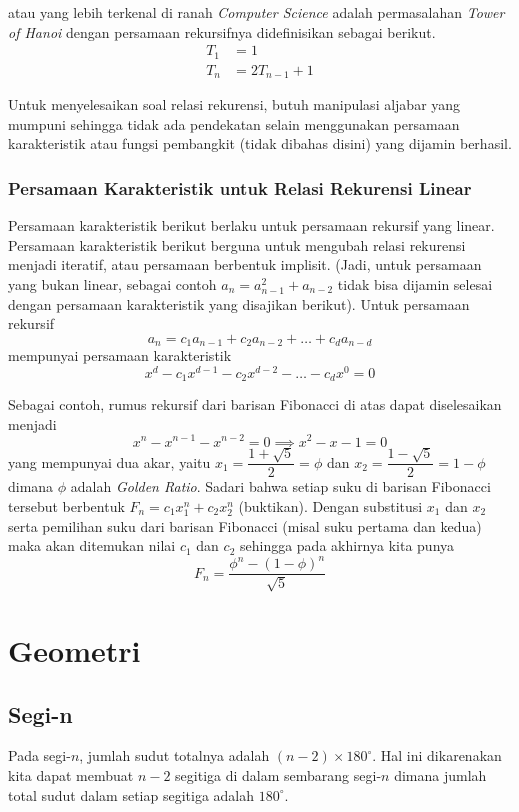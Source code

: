     atau yang lebih terkenal di ranah \textit{Computer Science} adalah permasalahan \textit{Tower of Hanoi} dengan persamaan rekursifnya didefinisikan sebagai berikut.
    \begin{align*}
        T_1 &= 1 \\
        T_n &= 2T_{n-1}+1
    \end{align*}
    
    Untuk menyelesaikan soal relasi rekurensi, butuh manipulasi aljabar yang mumpuni sehingga tidak ada pendekatan selain menggunakan persamaan karakteristik atau fungsi pembangkit (tidak dibahas disini) yang dijamin berhasil.
    
    \subsubsection{Persamaan Karakteristik untuk Relasi Rekurensi Linear}
    Persamaan karakteristik berikut berlaku untuk persamaan rekursif yang linear. Persamaan karakteristik berikut berguna untuk mengubah relasi rekurensi menjadi iteratif, atau persamaan berbentuk implisit. (Jadi, untuk persamaan yang bukan linear, sebagai contoh $a_n = a_{n-1}^2 + a_{n-2}$ tidak bisa dijamin selesai dengan persamaan karakteristik yang disajikan berikut).
    Untuk persamaan rekursif
    $$a_n = c_1a_{n-1}+c_2a_{n-2}+\dots+c_da_{n-d}$$
    mempunyai persamaan karakteristik
    $$x^d-c_1x^{d-1}-c_2x^{d-2}-\dots-c_dx^0=0$$
    
    Sebagai contoh, rumus rekursif dari barisan Fibonacci di atas dapat diselesaikan menjadi 
    $$x^{n}-x^{n-1}-x^{n-2}=0 \implies x^2-x-1=0$$
    yang mempunyai dua akar, yaitu $x_1 = \dfrac{1+\sqrt{5}}{2}=\phi$ dan $x_2 = \dfrac{1-\sqrt{5}}{2}=1-\phi$ dimana $\phi$ adalah \textit{Golden Ratio}. Sadari bahwa setiap suku di barisan Fibonacci tersebut berbentuk $F_n = c_1x_1^n + c_2x_2^n$ (buktikan). Dengan substitusi $x_1$ dan $x_2$ serta pemilihan suku dari barisan Fibonacci (misal suku pertama dan kedua) maka akan ditemukan nilai $c_1$ dan $c_2$ sehingga pada akhirnya kita punya
    $$F_n=\dfrac{\phi^n-(1-\phi)^n}{\sqrt{5}}$$
    
    

\section{Geometri}
    \subsection{Segi-n}
    Pada segi-$n$, jumlah sudut totalnya adalah $(n-2)\times 180^\circ$. Hal ini dikarenakan kita dapat membuat $n-2$ segitiga di dalam sembarang segi-$n$ dimana jumlah total sudut dalam setiap segitiga adalah $180^\circ$.\\
    
